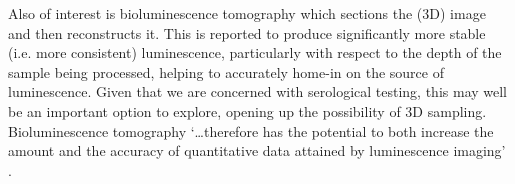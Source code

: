 \documentclass[a4paper]{article}
\begin{document}
\begin{multicols*}{2}
Also of interest is bioluminescence tomography which sections the (3D) image and then reconstructs it. This is reported to produce significantly more stable (i.e. more consistent) luminescence, particularly with respect to the depth of the sample being processed, helping to accurately home-in on the source of luminescence. Given that we are concerned with serological testing, this may well be an important option to explore, opening up the possibility of 3D sampling. Bioluminescence tomography ‘…therefore has the potential to both increase the amount and the accuracy of quantitative data attained by luminescence imaging’ \citep{guggenheim2013bioluminescence}.




\end{multicols*}
\end{document}
